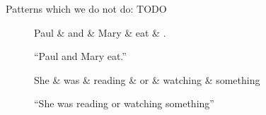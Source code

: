 \documentclass[11pt,a4paper]{article}
\begin{document}
Patterns which we do not do:
TODO

\begin{figure}[h]
    \centering
    \begin{dependency}
    \begin{deptext}[column sep=1em]
    Paul \& and \& Mary \& eat \& . \\
    \end{deptext}
    \end{dependency}
    \caption{``Paul and Mary eat.''}
\end{figure}

\begin{figure}[h]
    \centering
    \begin{dependency}
    \begin{deptext}[column sep=1em]
    She \& was \& reading \& or \& watching \& something  \\
    \end{deptext}
    \end{dependency}
    \caption{``She was reading or watching something''}
\end{figure}
    
\end{document}
